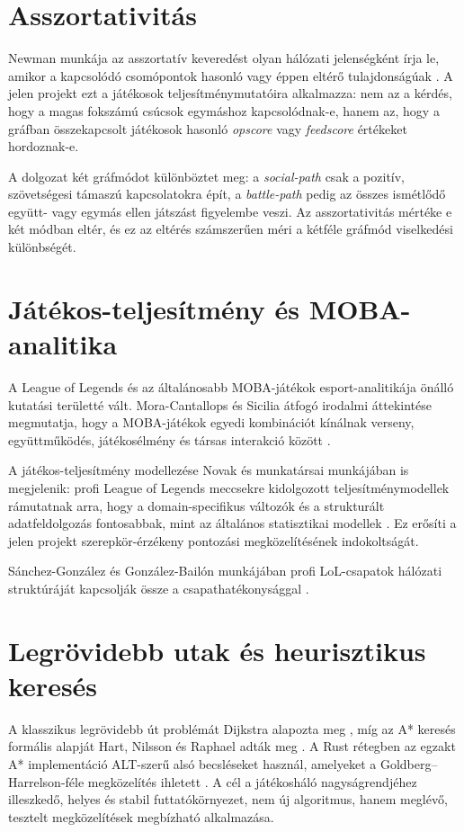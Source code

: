 \section{Asszortativitás}

Newman munkája az asszortatív keveredést olyan hálózati jelenségként írja le, amikor a kapcsolódó csomópontok hasonló vagy éppen eltérő tulajdonságúak \cite{newman2003}. A jelen projekt ezt a játékosok teljesítménymutatóira alkalmazza: nem az a kérdés, hogy a magas fokszámú csúcsok egymáshoz kapcsolódnak-e, hanem az, hogy a gráfban összekapcsolt játékosok hasonló \textit{opscore} vagy \textit{feedscore} értékeket hordoznak-e.

A dolgozat két gráfmódot különböztet meg: a \textit{social-path} csak a pozitív, szövetségesi támaszú kapcsolatokra épít, a \textit{battle-path} pedig az összes ismétlődő együtt- vagy egymás ellen játszást figyelembe veszi. Az asszortativitás mértéke e két módban eltér, és ez az eltérés számszerűen méri a kétféle gráfmód viselkedési különbségét.

\section{Játékos-teljesítmény és MOBA-analitika}

A League of Legends és az általánosabb MOBA-játékok esport-analitikája önálló kutatási területté vált. Mora-Cantallops és Sicilia átfogó irodalmi áttekintése megmutatja, hogy a MOBA-játékok egyedi kombinációt kínálnak verseny, együttműködés, játékosélmény és társas interakció között \cite{moracantallops2019}.

A játékos-teljesítmény modellezése Novak és munkatársai munkájában is megjelenik: profi League of Legends meccsekre kidolgozott teljesítménymodellek rámutatnak arra, hogy a domain-specifikus változók és a strukturált adatfeldolgozás fontosabbak, mint az általános statisztikai modellek \cite{novak2022}. Ez erősíti a jelen projekt szerepkör-érzékeny pontozási megközelítésének indokoltságát.

Sánchez-González és González-Bailón munkájában profi LoL-csapatok hálózati struktúráját kapcsolják össze a csapathatékonysággal \cite{sanchezgonzalezBailon2023}.

\section{Legrövidebb utak és heurisztikus keresés}

A klasszikus legrövidebb út problémát Dijkstra alapozta meg \cite{dijkstra1959}, míg az A* keresés formális alapját Hart, Nilsson és Raphael adták meg \cite{hart1968}. A Rust rétegben az egzakt A* implementáció ALT-szerű alsó becsléseket használ, amelyeket a Goldberg–Harrelson-féle megközelítés ihletett \cite{goldberg2005}. A cél a játékosháló nagyságrendjéhez illeszkedő, helyes és stabil futtatókörnyezet, nem új algoritmus, hanem meglévő, tesztelt megközelítések megbízható alkalmazása.

